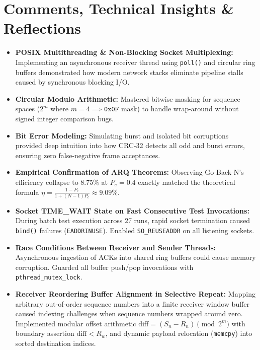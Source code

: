\documentclass[11pt,a4paper]{article}
\begin{document}
\section{Comments, Technical Insights \& Reflections}

\begin{commentbox}
\begin{itemize}[leftmargin=1.2em]
    \item \textbf{POSIX Multithreading \& Non-Blocking Socket Multiplexing:} Implementing an asynchronous receiver thread using \texttt{poll()} and circular ring buffers demonstrated how modern network stacks eliminate pipeline stalls caused by synchronous blocking I/O.
    \item \textbf{Circular Modulo Arithmetic:} Mastered bitwise masking for sequence spaces ($2^m$ where $m=4 \implies \mathtt{0x0F}$ mask) to handle wrap-around without signed integer comparison bugs.
    \item \textbf{Bit Error Modeling:} Simulating burst and isolated bit corruptions provided deep intuition into how CRC-32 detects all odd and burst errors, ensuring zero false-negative frame acceptances.
    \item \textbf{Empirical Confirmation of ARQ Theorems:} Observing Go-Back-N's efficiency collapse to $8.75\%$ at $P_e=0.4$ exactly matched the theoretical formula $\eta = \frac{1-P_e}{1+(N-1)P_e} \approx 9.09\%$.
\end{itemize}
\end{commentbox}

\begin{commentbox}
\begin{itemize}[leftmargin=1.2em]
    \item \textbf{Socket TIME\_WAIT State on Fast Consecutive Test Invocations:} During batch test execution across 27 runs, rapid socket termination caused \texttt{bind()} failures (\texttt{EADDRINUSE}). Enabled \texttt{SO\_REUSEADDR} on all listening sockets.
    \item \textbf{Race Conditions Between Receiver and Sender Threads:} Asynchronous ingestion of ACKs into shared ring buffers could cause memory corruption. Guarded all buffer push/pop invocations with \texttt{pthread\_mutex\_lock}.
    \item \textbf{Receiver Reordering Buffer Alignment in Selective Repeat:} Mapping arbitrary out-of-order sequence numbers into a finite receiver window buffer caused indexing challenges when sequence numbers wrapped around zero. Implemented modular offset arithmetic $\text{diff} = (S_n - R_n) \pmod{2^m}$ with boundary assertion $\text{diff} < R_w$, and dynamic payload relocation (\texttt{memcpy}) into sorted destination indices.
\end{itemize}
\end{commentbox}
\end{document}
